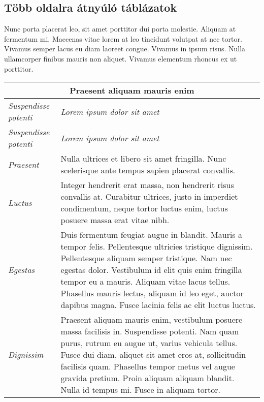 \subsection{Több oldalra átnyúló táblázatok} %

Nunc porta placerat leo, sit amet porttitor dui porta molestie. Aliquam at fermentum mi. Maecenas vitae lorem at leo tincidunt volutpat at nec tortor. Vivamus semper lacus eu diam laoreet congue. Vivamus in ipsum risus. Nulla ullamcorper finibus mauris non aliquet. Vivamus elementum rhoncus ex ut porttitor.

\begin{center}
	\begin{longtable}{ | p{} | p{} | }
		
		\hline
		\multicolumn{2}{|c|}{\textbf{Praesent aliquam mauris enim}}
		\\ \hline
		
		\emph{Suspendisse potenti} & \emph{Lorem ipsum dolor sit amet}
		\\ \hline \hline
		\endfirsthead %
		
		\hline
		\emph{Suspendisse potenti} & \emph{Lorem ipsum dolor sit amet}
		\\ \hline \hline
		\endhead %
		
		\hline
		\endfoot %
		
		\endlastfoot %
		
		\emph{Praesent}
		& Nulla ultrices et libero sit amet fringilla. Nunc scelerisque ante tempus sapien placerat convallis.
		\\ \hline
		
		\emph{Luctus}
		& Integer hendrerit erat massa, non hendrerit risus convallis at. Curabitur ultrices, justo in imperdiet condimentum, neque tortor luctus enim, luctus posuere massa erat vitae nibh.
		\\ \hline
		
		\emph{Egestas}
		& Duis fermentum feugiat augue in blandit. Mauris a tempor felis. Pellentesque ultricies tristique dignissim. Pellentesque aliquam semper tristique. Nam nec egestas dolor. Vestibulum id elit quis enim fringilla tempor eu a mauris. Aliquam vitae lacus tellus. Phasellus mauris lectus, aliquam id leo eget, auctor dapibus magna. Fusce lacinia felis ac elit luctus luctus.
		\\ \hline
		
		\emph{Dignissim}
		& Praesent aliquam mauris enim, vestibulum posuere massa facilisis in. Suspendisse potenti. Nam quam purus, rutrum eu augue ut, varius vehicula tellus. Fusce dui diam, aliquet sit amet eros at, sollicitudin facilisis quam. Phasellus tempor metus vel augue gravida pretium. Proin aliquam aliquam blandit. Nulla id tempus mi. Fusce in aliquam tortor.
		\\ \hline
		

\end{longtable}
\end{center}
